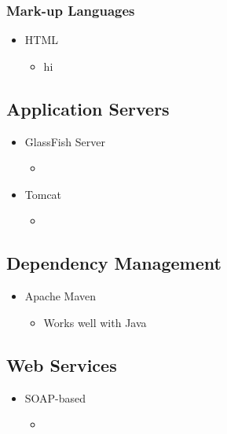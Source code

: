 \subsubsection{Mark-up Languages}
\begin{itemize}
	\item HTML
	\begin{itemize}
	\item hi
	\end{itemize}
\end{itemize}


\subsection{Application Servers}
\begin{itemize}
	\item GlassFish Server
	\begin{itemize}
	\item 
	\end{itemize}

	\item Tomcat
	\begin{itemize}
	\item 
	\end{itemize}


\end{itemize}

\subsection{Dependency Management}
\begin{itemize}
	\item Apache Maven
	\begin{itemize}
	\item Works well with Java
	\end{itemize}

\end{itemize}

\subsection{Web Services}
\begin{itemize}
	\item SOAP-based
	\begin{itemize}
	\item 
	\end{itemize}

\end{itemize}
